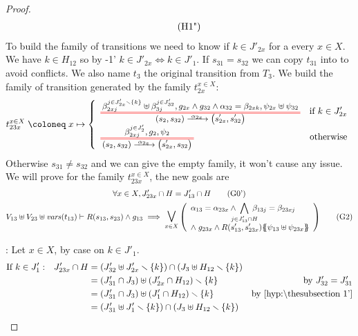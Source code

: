 \documentclass{article}
\begin{document}
\begin{proof}
\begin{gather*}
{\begin{array}{l}
		\end{array}} \hyp{1"}
	\end{gather*}
	To build the family of transitions we need to know if \(k \in J'_{2x}\) for a every \(x \in X\).
	We have \(k \in H_{12}\) so by \hyp{1'} \(k \in J'_{2x} \iff k \in J'_1\).
	If \(s_{31} = s_{32}\) we can copy \(t_{31}\) into  to avoid conflicts.
	We also name \(t_3\) the original transition from \(T_3\).
	We build the family of transition generated by the family \(t_{2x}^{x \in X}\):
	\[ t_{23x}^{x \in X} \defobject x \mapsto \choice{
		\OT{\mpar{s_2, s_{32}}}{\mpar{s'_{2x}, s'_{32}}}{\alpha_{2x}}{\beta_{2xj}^{j \in J'_{2x} \setminus \mbrc{k}} \uplus \beta_{3j}^{j \in J'_{32}}}{g_{2x} \wedge g_{32} \wedge \alpha_{32} = \beta_{2xk}}{\psi_{2x} \uplus \psi_{32}} & \text{if } k \in J'_{2x} \\
		\OT{\mpar{s_2, s_{32}}}{\mpar{s'_{2x}, s_{32}}}{\alpha_{2x}}{\beta_{2xj}^{j \in J'_2}}{g_2}{\psi_2} & \text{otherwise}
	} \]
	Otherwise \(s_{31} \neq s_{32}\) and we can give the empty family, it won't cause any issue.
	We will prove  for the family \(t_{23x}^{x \in X}\), the new goals are
	\begin{gather}
		\forall x \in X, J'_{23x} \cap H = J'_{13} \cap H \goal{0'} \\
		V_{13} \uplus V_{23} \uplus \fvars{t_{13}} \vdash R\mpar{s_{13}, s_{23}} \wedge g_{13} \implies \operatorname*{\bigsymb{\bigvee}}_{x \in X} \mpar{\everymath{\displaystyle}\begin{array}{l}
			\alpha_{13} = \alpha_{23x} \wedge \bigwedge_\subbox{j \in J'_{13} \cap H} \beta_{13j} = \beta_{23xj} \\[12pt]
			\nwedge g_{23x} \wedge R\mpar{s'_{13}, s'_{23x}}\psubst{\psi_{13} \uplus \psi_{23x}}
		\end{array}} \goal{2}
	\end{gather}
\item[\goal{0'}:] Let \(x \in X\), by case on \(k \in J'_1\).
	\begin{align*}
		\text{If } k \in J'_1: && J'_{23x} \cap H & = \mpar{J'_{32} \uplus J'_{2x} \setminus \mbrc{k}} \cap \mpar{J_3 \uplus H_{12} \setminus \mbrc{k}} \\
		&&& = \mpar{J'_{31} \cap J_3} \uplus \mpar{J'_{2x} \cap H_{12}} \setminus \mbrc{k} & \text{by } J'_{32} = J'_{31} \\
		&&& = \mpar{J'_{31} \cap J_3} \uplus \mpar{J'_1 \cap H_{12}} \setminus \mbrc{k} & \text{by \hyp{1'}} \\
		&&& = \mpar{J'_{31} \uplus J'_1 \setminus \mbrc{k}} \cap \mpar{J_3 \uplus H_{12} \setminus \mbrc{k}} \\

\end{align*}
\end{proof}
\end{document}
